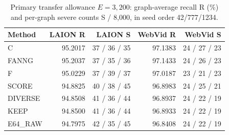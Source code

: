 \begin{table}[t]
\centering
\caption{Primary transfer allowance $E=3{,}200$: graph-average recall R (\%) and per-graph severe counts S / 8,000, in seed order 42/777/1234.}
\label{tab:transferfamily}
\small
\begin{tabular}{@{}lrrrr@{}}
\toprule
Method & LAION R & LAION S & WebVid R & WebVid S \\
\midrule
C & 95.2017 & 37 / 36 / 35 & 97.1383 & 24 / 27 / 23 \\
FANNG & 95.2037 & 37 / 35 / 36 & 97.1433 & 24 / 26 / 23 \\
F & 95.0229 & 37 / 39 / 37 & 97.0187 & 23 / 21 / 23 \\
SCORE & 94.8825 & 40 / 38 / 45 & 96.8983 & 24 / 25 / 21 \\
DIVERSE & 94.8508 & 41 / 36 / 44 & 96.8937 & 24 / 22 / 19 \\
KEEP & 94.8500 & 41 / 36 / 44 & 96.8933 & 24 / 22 / 19 \\
E64\_RAW & 94.7975 & 42 / 35 / 45 & 96.8408 & 24 / 22 / 19 \\
\bottomrule
\end{tabular}
\end{table}
